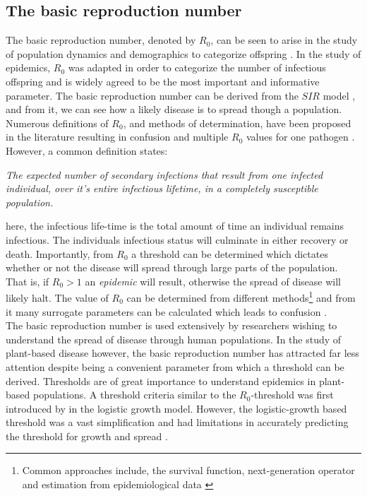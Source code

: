 \subsection{The basic reproduction number}
The basic reproduction number, denoted by $R_0$, can be seen to arise in the study of population dynamics and demographics to categorize offspring \cite{heesterbeek2002brief}. In the study of epidemics, $R_0$ was adapted in order to categorize the number of infectious offspring and is widely agreed to be the most important and informative parameter. The basic reproduction number can be derived from the $SIR$ model \cite{kermack-model}, and from it, we can see how a likely disease is to spread though a population. Numerous definitions of $R_0$, and methods of determination, have been proposed in the literature resulting in confusion and multiple $R_0$ values for one pathogen \cite{delamater2019complexity}. However, a common definition states:

\textit{The expected number of secondary infections that result from one infected individual, over it's entire infectious lifetime, in a completely susceptible population.}

here, the infectious life-time is the total amount of time an individual remains infectious. The individuals infectious status will culminate in either recovery or death. Importantly, from $R_0$ a threshold can be determined which dictates whether or not the disease will spread through large parts of the population. That is, if $R_0>1$ an \textit{epidemic} will result, otherwise the spread of disease will likely halt. The value of $R_0$ can be determined from different methods\footnote{Common approaches include, the survival function, next-generation operator and estimation from epidemiological data \cite{perspectives-on-r0}} and from it many surrogate parameters can be calculated which leads to confusion \cite{diekmann2010construction}.\\

The basic reproduction number is used extensively by researchers wishing to understand the spread of disease through human populations. In the study of plant-based disease however, the basic reproduction number has attracted far less attention despite being a convenient parameter from which a threshold can be derived. Thresholds are of great importance to understand epidemics in plant-based populations. A threshold criteria similar to the $R_0$-threshold was first introduced by \cite{van2013plant} in the logistic growth model. However, the logistic-growth based threshold was a vast simplification and had limitations in accurately predicting the threshold for growth and spread \cite{onstad1992evaluation}.\\

